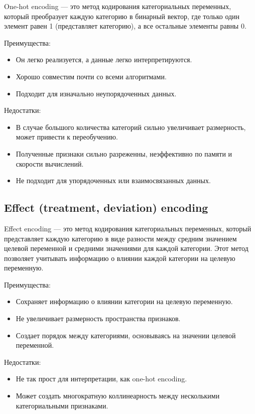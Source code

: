 One-hot encoding — это метод кодирования категориальных переменных, который преобразует каждую категорию в бинарный вектор, где только один элемент равен 1 (представляет категорию), а все остальные элементы равны 0.

Преимущества:
\begin{itemize}
	\item Он легко реализуется, а данные легко интерпретируются.
	\item Хорошо совместим почти со всеми алгоритмами.
	\item Подходит для изначально неупорядоченных данных.
\end{itemize}

Недостатки:
\begin{itemize}
	\item В случае большого количества категорий сильно увеличивает размерность, может привести к переобучению.
	\item Полученные признаки сильно разреженны, неэффективно по памяти и скорости вычислений.
	\item Не подходит для упорядоченных или взаимосвязанных данных.
\end{itemize}

\subsection*{Effect (treatment, deviation) encoding}

Effect encoding  — это метод кодирования категориальных переменных, который представляет каждую категорию в виде разности между средним значением целевой переменной и средними значениями для каждой категории. Этот метод позволяет учитывать информацию о влиянии каждой категории на целевую переменную.

Преимущества:
\begin{itemize}
	\item Сохраняет информацию о влиянии категории на целевую переменную.
	\item Не увеличивает размерность пространства признаков.
	\item Создает порядок между категориями, основываясь на значении целевой переменной.
\end{itemize}

Недостатки:
\begin{itemize}
	\item Не так прост для интерпретации, как one-hot encoding.
	\item Может создать многократную коллинеарность между несколькими категориальными признаками.
\end{itemize}

